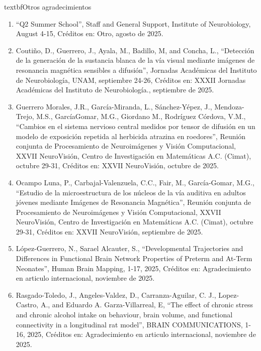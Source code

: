 textbf{Otros agradecimientos}

\begin{enumerate}

\item “Q2 Summer School”, Staff and General Support, Institute of Neurobiology, August 4-15, Créditos en: Otro, agosto de 2025.

\item Coutiño, D., Guerrero, J., Ayala, M., Badillo, M, and Concha, L., “Detección de la generación de la sustancia blanca de la vía visual 
mediante imágenes de resonancia magnética sensibles a difusión”, Jornadas Académicas del Instituto de Neurobiología, UNAM, septiembre 24-26, 
Créditos en: XXXII Jornadas Académicas del Instituto de Neurobiología., septiembre de 2025.

\item Guerrero Morales, J.R., García-Miranda, L., Sánchez-Yépez, J., Mendoza-Trejo, M.S., GarcíaGomar, M.G., Giordano M., Rodríguez Córdova, 
V.M., 
“Cambios en el sistema nervioso central medidos por tensor de difusión en un modelo de exposición repetida al herbicida atrazina en 
roedores”, Reunión conjunta de Procesamiento de Neuroimágenes y Visión Computacional, XXVII NeuroVisión, Centro de Investigación en 
Matemáticas A.C. (Cimat), octubre 29-31, Créditos en: XXVII NeuroVisión, octubre de 2025.

\item Ocampo Luna, P., Carbajal-Valenzuela, C.C., Fair, M., García-Gomar, M.G., “Estudio de la microestructura de los núcleos de la vía 
auditiva en 
adultos jóvenes mediante Imágenes de Resonancia Magnética”, Reunión conjunta de Procesamiento de Neuroimágenes y Visión Computacional, XXVII 
NeuroVisión, Centro de Investigación en Matemáticas A.C. (Cimat), octubre 29-31, Créditos en: XXVII NeuroVisión, septiembre de 2025.

\item López-Guerrero, N., Sarael Alcauter, S., “Developmental Trajectories and Differences in Functional Brain Network Properties of Preterm 
and 
At-Term Neonates”, Human Brain Mapping, 1-17, 2025, Créditos en: Agradecimiento en articulo internacional, noviembre de 2025.

\item Rasgado-Toledo, J., Angeles-Valdez, D., Carranza-Aguilar, C. J., Lopez-Castro, A., and Eduardo A. Garza-Villarreal, E, “The effect of 
chronic 
stress and chronic alcohol intake on behaviour, brain volume, and functional connectivity in a longitudinal rat model”, BRAIN COMMUNICATIONS, 
1-16, 2025, Créditos en: Agradecimiento en articulo internacional, noviembre de 2025.


\end{enumerate}
